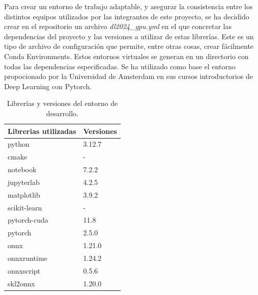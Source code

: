 Para crear un entorno de trabajo adaptable, y asegurar la consistencia entre los distintos equipos utilizados por las integrantes de este proyecto, se ha decidido crear en el repositorio un archivo \textit{dl2024\_gpu.yml} en el que concretar las dependencias del proyecto y las versiones a utilizar de estas librerías. Este es un tipo de archivo de configuración que permite, entre otras cosas, crear fácilmente Conda Environments. Estos entornos virtuales se generan en un directorio con todas las dependencias especificadas. Se ha utilizado como base el entorno propocionado por la Universidad de Amsterdam en sus cursos introductorios de Deep Learning con Pytorch.
\begin{table}[H]
    \begin{center}
        \begin{tabular}{ | m{4cm} | m{2cm} | }
        \hline Librerias utilizadas & Versiones \\ \hline
            python & 3.12.7 \\ \hline
            cmake & - \\ \hline
            notebook & 7.2.2 \\ \hline 
            jupyterlab & 4.2.5 \\ \hline 
            matplotlib & 3.9.2 \\ \hline 
            scikit-learn & - \\ \hline
            pytorch-cuda & 11.8 \\ \hline
            pytorch & 2.5.0 \\ \hline
            onnx & 1.21.0 \\ \hline
            onnxruntime & 1.24.2 \\ \hline
            onnxscript & 0.5.6 \\ \hline
            skl2onnx & 1.20.0 \\ \hline
        \end{tabular}
    \end{center}
    \caption{Librerías y versiones del entorno de desarrollo.}
\end{table}

